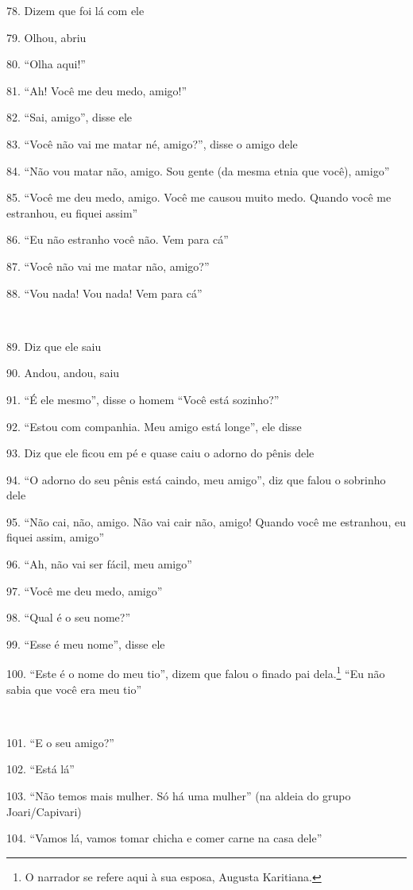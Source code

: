 78. Dizem que foi lá com ele

79. Olhou, abriu

80. ``Olha aqui!''

81. ``Ah! Você me deu medo, amigo!''

82. ``Sai, amigo'', disse ele

83. ``Você não vai me matar né, amigo?'', disse o amigo dele

84. ``Não vou matar não, amigo. Sou gente (da mesma etnia que você), amigo''

85. ``Você me deu medo, amigo. Você me causou muito medo. Quando você me
estranhou, eu fiquei assim''

86. ``Eu não estranho você não. Vem para cá''

87. ``Você não vai me matar não, amigo?''

88. ``Vou nada! Vou nada! Vem para cá''

~

89. Diz que ele saiu

90. Andou, andou, saiu

91. ``É ele mesmo'', disse o homem ``Você está sozinho?''

92. ``Estou com companhia. Meu amigo está longe'', ele disse

93. Diz que ele ficou em pé e quase caiu o adorno do pênis dele

94. ``O adorno do seu pênis está caindo, meu amigo'', diz que falou o
sobrinho dele

95. ``Não cai, não, amigo. Não vai cair não, amigo! Quando você me
estranhou, eu fiquei assim, amigo''

96. ``Ah, não vai ser fácil, meu amigo''

97. ``Você me deu medo, amigo''

98. ``Qual é o seu nome?''

99. ``Esse é meu nome'', disse ele

100. ``Este é o nome do meu tio'', dizem que falou o finado pai
dela.\footnote{O narrador se refere aqui à sua esposa, Augusta Karitiana.}
``Eu não sabia que você era meu tio''

~

101. ``E o seu amigo?''

102. ``Está lá''

103. ``Não temos mais mulher. Só há uma mulher'' (na aldeia do grupo
Joari/Capivari)

104. ``Vamos lá, vamos tomar chicha e comer carne na casa dele''


